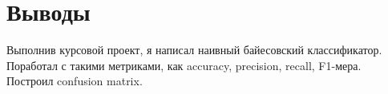 \section{Выводы}
Выполнив курсовой проект, я написал наивный байесовский классификатор. Поработал с такими метриками, как accuracy, precision,
recall, F1-мера. Построил confusion matrix.
\pagebreak
